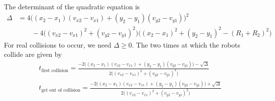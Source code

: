 The determinant of the quadratic equation is
\begin{align*}
    \Delta
     & =
    4\big((x_2 - x_1)(v_{x2} - v_{x1}) + (y_2 - y_1)(v_{y2} - v_{y1})\big)^2
    \\ & \qquad
    - 4\big((v_{x2} - v_{x1})^2 + (v_{y2} - v_{y1})^2\big)\big((x_2 - x_1)^2 + (y_2 - y_1)^2 - (R_1 + R_2)^2\big)
\end{align*}
For real collisions to occur, we need \( \Delta \geq 0 \).
The two times at which the robots collide are given by
\begin{align*}
     &
    \boxed{
        t_{\text{first collision}}
        =
        \frac{-2\big((x_2 - x_1)(v_{x2} - v_{x1}) + (y_2 - y_1)(v_{y2} - v_{y1})\big) - \sqrt{\Delta}}{2\big((v_{x2} - v_{x1})^2 + (v_{y2} - v_{y1})^2\big)}
    }
    \\ &
    \boxed{
        t_{\text{get out of collision}}
        =
        \frac{-2\big((x_2 - x_1)(v_{x2} - v_{x1}) + (y_2 - y_1)(v_{y2} - v_{y1})\big) + \sqrt{\Delta}}{2\big((v_{x2} - v_{x1})^2 + (v_{y2} - v_{y1})^2\big)}
    }
\end{align*}
